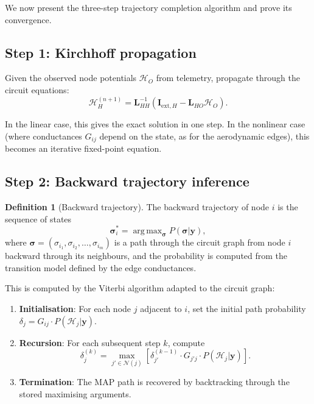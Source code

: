 \documentclass[twocolumn,10pt,a4paper]{article}
\theoremstyle{definition}
\newtheorem{definition}[theorem]{Definition}
\theoremstyle{remark}
\newcommand{\Hcal}{\mathcal{H}}
\newcommand{\vect}[1]{\boldsymbol{#1}}
\newcommand{\mat}[1]{\mathbf{#1}}
\DeclareMathOperator*{\argmax}{arg\,max}
\begin{document}
We now present the three-step trajectory completion algorithm and prove its convergence.

\subsection{Step 1: Kirchhoff propagation}

Given the observed node potentials $\vect{\Hcal}_O$ from telemetry, propagate through the circuit equations:
\begin{equation}\label{eq:kirchhoff_prop}
    \vect{\Hcal}_H^{(n+1)} = \mat{L}_{HH}^{-1} \left( \vect{I}_{\mathrm{ext},H} - \mat{L}_{HO} \vect{\Hcal}_O \right).
\end{equation}

In the linear case, this gives the exact solution in one step. In the nonlinear case (where conductances $G_{ij}$ depend on the state, as for the aerodynamic edges), this becomes an iterative fixed-point equation.

\subsection{Step 2: Backward trajectory inference}

\begin{definition}[Backward trajectory]\label{def:backward_traj}
The backward trajectory of node $i$ is the sequence of states
\begin{equation}\label{eq:backward_traj}
    \vect{\sigma}_i^* = \argmax_{\vect{\sigma}} P(\vect{\sigma} | \vect{y}),
\end{equation}
where $\vect{\sigma} = (\sigma_{i_1}, \sigma_{i_2}, \ldots, \sigma_{i_m})$ is a path through the circuit graph from node $i$ backward through its neighbours, and the probability is computed from the transition model defined by the edge conductances.
\end{definition}

This is computed by the Viterbi algorithm \citep{Viterbi1967} adapted to the circuit graph:

\begin{enumerate}
    \item \textbf{Initialisation}: For each node $j$ adjacent to $i$, set the initial path probability $\delta_j = G_{ij} \cdot P(\Hcal_j | \vect{y})$.
    \item \textbf{Recursion}: For each subsequent step $k$, compute
    \begin{equation}\label{eq:viterbi}
        \delta_{j}^{(k)} = \max_{j' \in \mathcal{N}(j)} \left[ \delta_{j'}^{(k-1)} \cdot G_{j'j} \cdot P(\Hcal_j | \vect{y}) \right].
    \end{equation}
    \item \textbf{Termination}: The MAP path is recovered by backtracking through the stored maximising arguments.
\end{enumerate}
\end{document}
